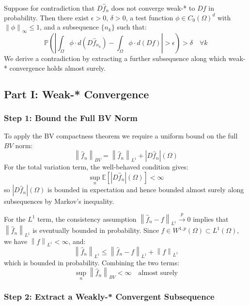 \documentclass[12pt]{article}
\newcommand{\norm}[1]{\left\| #1 \right\|}
\newcommand{\E}{\mathbb{E}}
\newcommand{\Lone}{L^1(\Omega)}
\newcommand{\Wonep}{W^{1,p}(\Omega)}
\newcommand{\fn}{\hat{f}_n}
\newcommand{\xrightarrowp}{\xrightarrow{p}}
\begin{document}
	Suppose for contradiction that $D\fn$ does not converge weak-* to $Df$ in
	probability. Then there exist $\epsilon > 0$, $\delta > 0$, a test function
	$\phi \in C_0(\Omega)^d$ with $\norm{\phi}_\infty \leq 1$, and a subsequence
	$\{n_k\}$ such that:
	\begin{equation}
		\mathbb{P}\!\left(\left|
		\int_\Omega \phi \cdot d(D\hat{f}_{n_k})
		- \int_\Omega \phi \cdot d(Df)
		\right| > \epsilon\right) > \delta
		\quad \forall k
	\end{equation}
	We derive a contradiction by extracting a further subsequence along which
	weak-* convergence holds almost surely.
	
	\subsection{Part I: Weak-* Convergence}
	
	\subsubsection*{Step 1: Bound the Full BV Norm}
	
	To apply the BV compactness theorem we require a uniform bound on the full
	$BV$ norm:
	\begin{equation}
		\norm{\fn}_{BV} = \norm{\fn}_{L^1} + |D\fn|(\Omega)
	\end{equation}
	For the total variation term, the well-behaved condition gives:
	\begin{equation}
		\sup_n \E\!\left[|D\fn|(\Omega)\right] < \infty
	\end{equation}
	so $|D\fn|(\Omega)$ is bounded in expectation and hence bounded almost
	surely along subsequences by Markov's inequality.
	
	For the $L^1$ term, the consistency assumption
	$\norm{\fn - f}_{L^1} \xrightarrowp 0$ implies that $\norm{\fn}_{L^1}$ is
	eventually bounded in probability. Since $f \in \Wonep \subset \Lone$, we
	have $\norm{f}_{L^1} < \infty$, and:
	\begin{equation}
		\norm{\fn}_{L^1}
		\leq \norm{\fn - f}_{L^1} + \norm{f}_{L^1}
	\end{equation}
	which is bounded in probability. Combining the two terms:
	\begin{equation}
		\sup_n \norm{\fn}_{BV} < \infty \quad \text{almost surely}
	\end{equation}
	
	\subsubsection*{Step 2: Extract a Weakly-* Convergent Subsequence}
	
\end{document}
